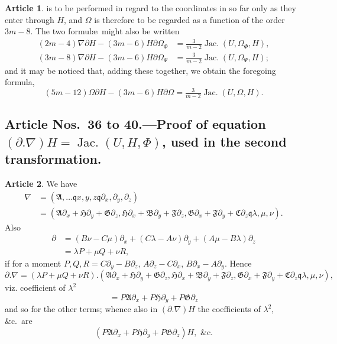 \documentclass[11pt,a4paper]{article}
\theoremstyle{definition}
\newtheorem{art}{Article}[section]
\DeclareMathOperator{\Jac}{Jac.}
\newcommand{\fA}{\mathfrak{A}}
\newcommand{\fB}{\mathfrak{B}}
\newcommand{\fC}{\mathfrak{C}}
\newcommand{\fF}{\mathfrak{F}}
\newcommand{\fG}{\mathfrak{G}}
\newcommand{\fH}{\mathfrak{H}}
\begin{document}
\begin{art}
is to be performed in regard to the coordinates in so far only as they enter through
$H$, and $\Omega$ is therefore to be regarded as a function of the order $3m-8$. The two
formul\ae\ might also be written
\begin{align*}
(2m-4)\nabla \partial H - (3m-6)H \partial \Omega_\Phi &= \tfrac{3}{m-2}\Jac(U, \Omega_\Phi, H), \\
(3m-8)\nabla \partial H - (3m-6)H \partial \Omega_\Psi &= \tfrac{3}{m-2}\Jac(U, \Omega_\Psi, H);
\end{align*}
and it may be noticed that, adding these together, we obtain the foregoing formula,
\[
(5m-12)\Omega \partial H - (3m-6)H \partial \Omega = \tfrac{3}{m-2}\Jac(U, \Omega, H).
\]
\end{art}

\subsection*{Article Nos.\ 36 to 40.---Proof of equation
$(\partial . \nabla)H = \Jac(U, H, \Phi)$, used in the second transformation.}

\setcounter{art}{35}
\begin{art}
We have
\begin{align*}
\nabla &= (\fA, \dots \mathbin{\mathfrak{q}} x, y, z \mathbin{\mathfrak{q}} \partial_x, \partial_y, \partial_z) \\
&= (\fA\partial_x + \fH\partial_y + \fG\partial_z,
\fH\partial_x + \fB\partial_y + \fF\partial_z,
\fG\partial_x + \fF\partial_y + \fC\partial_z \mathbin{\mathfrak{q}} \lambda, \mu, \nu).
\end{align*}
Also
\begin{align*}
\partial &= (B\nu - C\mu)\partial_x + (C\lambda - A\nu)\partial_y
+ (A\mu - B\lambda)\partial_z \\
&= \lambda P + \mu Q + \nu R,
\end{align*}
if for a moment $P, Q, R = C\partial_y - B\partial_z$, $A\partial_z - C\partial_x$,
$B\partial_x - A\partial_y$.
Hence
\[
\partial . \nabla = (\lambda P + \mu Q + \nu R).
(\fA\partial_x + \fH\partial_y + \fG\partial_z,
\fH\partial_x + \fB\partial_y + \fF\partial_z,
\fG\partial_x + \fF\partial_y + \fC\partial_z \mathbin{\mathfrak{q}} \lambda, \mu, \nu),
\]
viz. coefficient of $\lambda^2$
\[
= P\fA\partial_x + P\fH\partial_y + P\fG\partial_z
\]
and so for the other terms; whence also in $(\partial . \nabla)H$ the coefficients of
$\lambda^2$, \&c.\ are
\[
(P\fA\partial_x + P\fH\partial_y + P\fG\partial_z)H, \text{ \&c.}
\]
\end{art}
\end{document}
